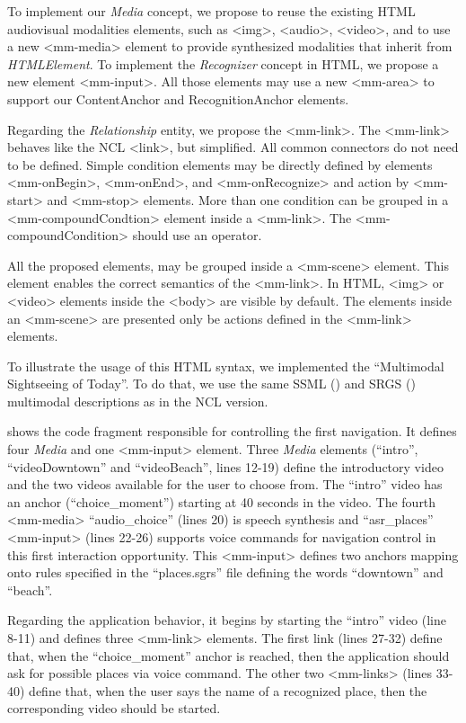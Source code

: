 
To implement our \textit{Media} concept, we propose to reuse the existing HTML
audiovisual modalities elements, such as <img>, <audio>, <video>, and to use a
new <mm-media> element to provide synthesized modalities that inherit from
\textit{HTMLElement}. To implement the \textit{Recognizer} concept in HTML, we
propose a new
element <mm-input>. All those elements may use a new <mm-area> to support our
ContentAnchor and RecognitionAnchor elements.

Regarding the \textit{Relationship} entity, we propose the <mm-link>. The
<mm-link> behaves like the NCL <link>, but simplified. All common connectors do
not need to be defined. Simple condition elements may be directly defined by
elements <mm-onBegin>, <mm-onEnd>, and <mm-onRecognize> and action by <mm-start>
and <mm-stop> elements. More than one condition can be grouped in a
<mm-compoundCondtion> element inside a <mm-link>. The <mm-compoundCondition>
should use an operator.

All the proposed elements, may be grouped inside a <mm-scene> element. This
element enables the correct semantics of the <mm-link>. In HTML, <img> or
<video> elements inside the <body> are visible by default. The elements inside
an <mm-scene> are presented only be actions defined in the <mm-link> elements.

To illustrate the usage of this HTML syntax, we implemented the “Multimodal
Sightseeing of Today”. To do that, we use the same SSML () and
SRGS () multimodal descriptions as in the NCL version.

 shows the code fragment responsible for controlling
the first navigation. It defines four \textit{Media} and one <mm-input>
element. Three \textit{Media} elements (“intro”, “videoDowntown” and
“videoBeach”, lines 12-19) define the introductory video and the two videos
available for the user to choose from.
The “intro” video has an anchor (“choice\_moment”) starting at 40 seconds in the
video. The fourth <mm-media> “audio\_choice” (lines 20) is speech synthesis and
“asr\_places” <mm-input> (lines 22-26) supports voice commands for navigation
control in this first interaction opportunity. This <mm-input> defines two
anchors mapping onto rules specified in the “places.sgrs” file defining the
words “downtown” and “beach”.

Regarding the application behavior, it begins by starting the “intro” video
(line 8-11) and defines three <mm-link> elements. The first link (lines 27-32)
define that, when the “choice\_moment” anchor is reached, then the application
should ask for possible places via voice command. The other two <mm-links>
(lines 33-40) define that, when the user says the name of a recognized place,
then the corresponding video should be started.


